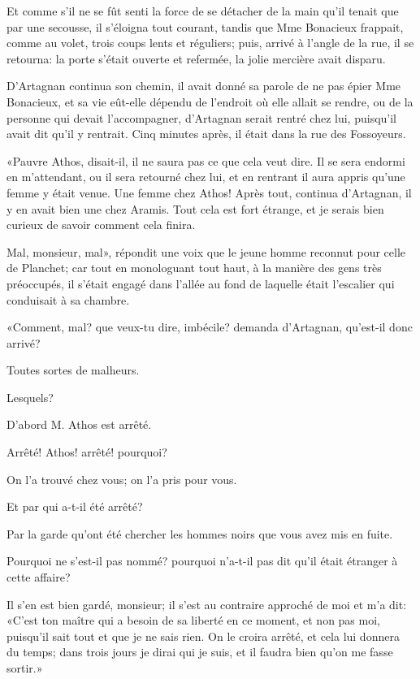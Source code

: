 Et comme s'il ne se fût senti la force de se détacher de la main qu'il tenait que par une secousse, il s'éloigna tout courant, tandis que Mme Bonacieux frappait, comme au volet, trois coups lents et réguliers; puis, arrivé à l'angle de la rue, il se retourna: la porte s'était ouverte et refermée, la jolie mercière avait disparu. 

D'Artagnan continua son chemin, il avait donné sa parole de ne pas épier Mme Bonacieux, et sa vie eût-elle dépendu de l'endroit où elle allait se rendre, ou de la personne qui devait l'accompagner, d'Artagnan serait rentré chez lui, puisqu'il avait dit qu'il y rentrait. Cinq minutes après, il était dans la rue des Fossoyeurs. 

«Pauvre Athos, disait-il, il ne saura pas ce que cela veut dire. Il se sera endormi en m'attendant, ou il sera retourné chez lui, et en rentrant il aura appris qu'une femme y était venue. Une femme chez Athos! Après tout, continua d'Artagnan, il y en avait bien une chez Aramis. Tout cela est fort étrange, et je serais bien curieux de savoir comment cela finira. 

\speak  Mal, monsieur, mal», répondit une voix que le jeune homme reconnut pour celle de Planchet; car tout en monologuant tout haut, à la manière des gens très préoccupés, il s'était engagé dans l'allée au fond de laquelle était l'escalier qui conduisait à sa chambre. 

«Comment, mal? que veux-tu dire, imbécile? demanda d'Artagnan, qu'est-il donc arrivé? 

\speak  Toutes sortes de malheurs. 

\speak  Lesquels? 

\speak  D'abord M. Athos est arrêté. 

\speak  Arrêté! Athos! arrêté! pourquoi? 

\speak  On l'a trouvé chez vous; on l'a pris pour vous. 

\speak  Et par qui a-t-il été arrêté? 

\speak  Par la garde qu'ont été chercher les hommes noirs que vous avez mis en fuite. 

\speak  Pourquoi ne s'est-il pas nommé? pourquoi n'a-t-il pas dit qu'il était étranger à cette affaire? 

\speak  Il s'en est bien gardé, monsieur; il s'est au contraire approché de moi et m'a dit: «C'est ton maître qui a besoin de sa liberté en ce moment, et non pas moi, puisqu'il sait tout et que je ne sais rien. On le croira arrêté, et cela lui donnera du temps; dans trois jours je dirai qui je suis, et il faudra bien qu'on me fasse sortir.» 

